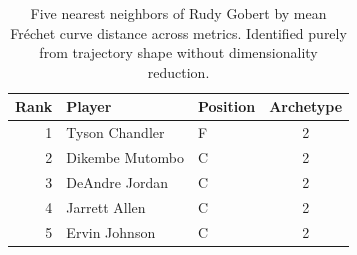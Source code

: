 \begin{table}[htbp]
  \centering\small
  \begin{tabular}{rllc}
    \toprule
    Rank & Player & Position & Archetype \\
    \midrule
    1 & Tyson Chandler & F & 2 \\
    2 & Dikembe Mutombo & C & 2 \\
    3 & DeAndre Jordan & C & 2 \\
    4 & Jarrett Allen & C & 2 \\
    5 & Ervin Johnson & C & 2 \\
    \bottomrule
  \end{tabular}
  \caption{Five nearest neighbors of Rudy Gobert by mean Fr\'{e}chet curve distance across metrics. Identified purely from trajectory shape without dimensionality reduction.}
  \label{tab:Rudy_Gobert_frechet_curve_neighbors}
\end{table}

